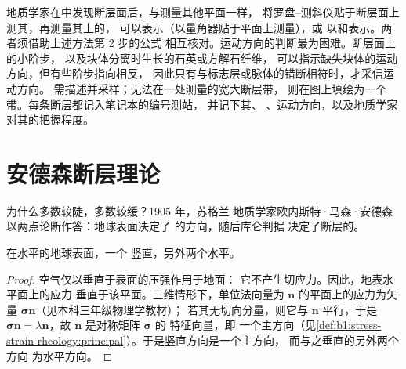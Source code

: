 \begin{inthefield}[测量断层面]
地质学家在中发现断层面后，与测量其他平面一样，
将罗盘–测斜仪贴于断层面上测其，再测量其上的，
可以表示（以量角器贴于平面上测量），或
以和表示。两者须借助上述方法第 2 步的公式
相互核对。运动方向的判断最为困难。断层面上的小阶步，
以及块体分离时生长的石英或方解石纤维，
可以指示缺失块体的运动方向，但有些阶步指向相反，
因此只有与标志层或脉体的错断相符时，才采信运动方向。
需描述并采样；无法在一处测量的宽大断层带，
则在图上填绘为一个带。每条断层都记入笔记本的编号测站，
并记下其、
、运动方向，以及地质学家对其的把握程度。
\end{inthefield}

\section{安德森断层理论}\label{sec:b1:faults-folds-fabrics:anderson}

为什么多数较陡，多数较缓？1905 年，苏格兰
地质学家欧内斯特·马森·安德森以两点论断作答：地球表面决定了
的方向，随后库仑判据
决定了断层的。

\begin{proposition}[自由表面构成一个主平面]\label{prop:b1:faults-folds-fabrics:free-surface}
在水平的地球表面，一个
竖直，另外两个水平。
\end{proposition}

\begin{proof}
空气仅以垂直于表面的压强作用于地面：
它不产生切应力。因此，地表水平面上的应力
垂直于该平面。三维情形下，单位法向量为
$\mathbf n$ 的平面上的应力为矢量 $\boldsymbol\sigma\mathbf n$（见本科三年级物理学教材）；
若其无切向分量，则它与 $\mathbf n$ 平行，于是
$\boldsymbol\sigma\mathbf n = \lambda\mathbf n$，故 $\mathbf n$ 是对称矩阵 $\boldsymbol\sigma$ 的
特征向量，即
一个主方向（见\cref{def:b1:stress-strain-rheology:principal}）。于是竖直方向是一个主方向，
而与之垂直的另外两个方向
为水平方向。
\end{proof}


